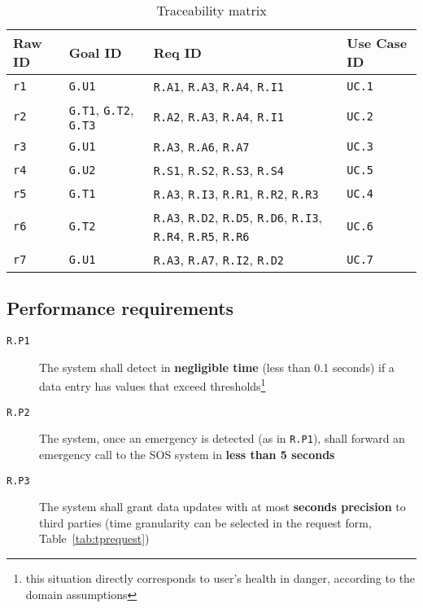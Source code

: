     \begin{table}[h!]
      \centering
      \begin{tabularx}{.8\linewidth}{|X|X|X|X|}
        \hline
        \textbf{Raw ID} & \textbf{Goal ID} & \textbf{Req ID} & \textbf{Use Case ID} \\ \hline
        \texttt{r1} & \texttt{G.U1} & \texttt{R.A1}, \texttt{R.A3}, \texttt{R.A4}, \texttt{R.I1} & \texttt{UC.1} \\
        \hline
        \texttt{r2} & \texttt{G.T1}, \texttt{G.T2}, \texttt{G.T3} & \texttt{R.A2}, \texttt{R.A3}, \texttt{R.A4}, \texttt{R.I1} & \texttt{UC.2} \\
        \hline
        \texttt{r3} & \texttt{G.U1} & \texttt{R.A3}, \texttt{R.A6}, \texttt{R.A7} & \texttt{UC.3} \\
        \hline
        \texttt{r4} & \texttt{G.U2} & \texttt{R.S1},  \texttt{R.S2}, \texttt{R.S3}, \texttt{R.S4} & \texttt{UC.5} \\
        \hline
        \texttt{r5} & \texttt{G.T1} & \texttt{R.A3}, \texttt{R.I3}, \texttt{R.R1}, \texttt{R.R2}, \texttt{R.R3}& \texttt{UC.4}  \\
        \hline
        \texttt{r6} & \texttt{G.T2} & \texttt{R.A3},  \texttt{R.D2}, \texttt{R.D5}, \texttt{R.D6}, \texttt{R.I3}, \texttt{R.R4}, \texttt{R.R5}, \texttt{R.R6} & \texttt{UC.6}   \\
        \hline
        \texttt{r7} & \texttt{G.U1} & \texttt{R.A3}, \texttt{R.A7},  \texttt{R.I2},  \texttt{R.D2} & \texttt{UC.7}   \\
        \hline
      \end{tabularx}
      \caption{Traceability matrix}
      \label{tab:tracmatrix}
    \end{table}

  \clearpage
  \subsection{Performance requirements}
  \label{sec:performance}

    \begin{description}
      \item[\texttt{R.P1}] The system shall detect in \textbf{negligible time} (less than 0.1 seconds) if a data entry has values that exceed thresholds\footnote{this situation directly corresponds to user's health in danger, according to the domain assumptions}
      \item[\texttt{R.P2}] The system, once an emergency is detected (as in \texttt{R.P1}), shall forward an emergency call to the SOS system in \textbf{less than 5 seconds}
      \item[\texttt{R.P3}] The system shall grant data updates with at most \textbf{seconds precision} to third parties (time granularity can be selected in the request form, Table~\ref{tab:tprequest})
    \end{description}

